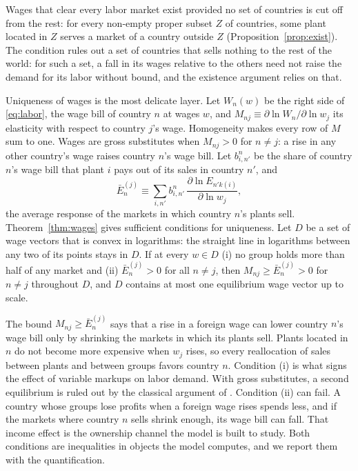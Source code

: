 \documentclass[11pt]{article}
\begin{document}
Wages that clear every labor market exist provided no set of countries is cut off from
the rest: for every non-empty proper subset $Z$ of countries, some plant located in $Z$
serves a market of a country outside $Z$ (Proposition~\ref{prop:exist}). The condition
rules out a set of countries that sells nothing to the rest of the world: for such a
set, a fall in its wages relative to the others need not raise the demand for its labor
without bound, and the existence argument relies on that.

Uniqueness of wages is the most delicate layer. Let $W_n(w)$ be the right
side of \eqref{eq:labor}, the wage bill of country $n$ at wages $w$, and
$M_{nj}\equiv\partial\ln W_n/\partial\ln w_j$ its elasticity with respect to country
$j$'s wage. Homogeneity makes every row of $M$ sum to one. Wages are gross substitutes
when $M_{nj}>0$ for $n\neq j$: a rise in any other country's wage
raises country $n$'s wage bill. Let $b^n_{i,n'}$ be the share of country $n$'s wage bill
that plant $i$ pays out of its sales in country $n'$, and
\begin{equation}
  \bar E^{(j)}_n\equiv\sum_{i,n'}b^n_{i,n'}\,\frac{\partial\ln E_{n'k(i)}}{\partial\ln w_j},
  \label{eq:demandterm}
\end{equation}
the average response of the markets in which country $n$'s plants sell.
Theorem~\ref{thm:wages} gives sufficient conditions for uniqueness. Let $D$ be a set of
wage vectors that is convex in logarithms: the straight line in logarithms between any
two of its points stays in $D$. If at every $w\in D$ (i) no group holds more than half
of any market and (ii) $\bar E^{(j)}_n>0$ for all $n\neq j$, then
$M_{nj}\ge\bar E^{(j)}_n>0$ for $n\neq j$ throughout $D$, and $D$ contains at most one
equilibrium wage vector up to scale.

The bound $M_{nj}\ge\bar E^{(j)}_n$ says that a rise in a foreign wage can
lower country $n$'s wage bill only by shrinking the markets in which its plants sell.
Plants located in $n$ do not become more expensive when $w_j$ rises, so every
reallocation of sales between plants and between groups favors country $n$.
Condition (i) is what signs the effect of variable markups on labor demand. With gross
substitutes, a second equilibrium is ruled out by the classical argument of
\citet{ArrowBlockHurwicz1959}. Condition (ii) can fail. A country whose groups lose
profits when a foreign wage rises spends less, and if the markets where country $n$
sells shrink enough, its wage bill can fall. That income effect is the ownership
channel the model is built to study. Both conditions are inequalities in objects the
model computes, and we report them with the quantification.
\end{document}
